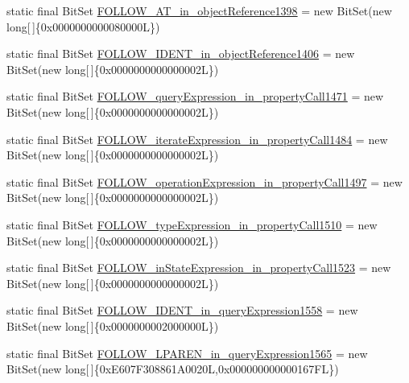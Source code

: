 \begin{DoxyCompactItemize}
static final Bit\-Set \hyperlink{classorg_1_1tzi_1_1use_1_1parser_1_1ocl_1_1_o_c_l_parser_aee007cd7fe0376940860c9b95a71a9f0}{F\-O\-L\-L\-O\-W\-\_\-\-A\-T\-\_\-in\-\_\-object\-Reference1398} = new Bit\-Set(new long\mbox{[}$\,$\mbox{]}\{0x0000000000080000\-L\})
\item 
static final Bit\-Set \hyperlink{classorg_1_1tzi_1_1use_1_1parser_1_1ocl_1_1_o_c_l_parser_ac5cac8876cc489e9118cdfc4c676e02a}{F\-O\-L\-L\-O\-W\-\_\-\-I\-D\-E\-N\-T\-\_\-in\-\_\-object\-Reference1406} = new Bit\-Set(new long\mbox{[}$\,$\mbox{]}\{0x0000000000000002\-L\})
\item 
static final Bit\-Set \hyperlink{classorg_1_1tzi_1_1use_1_1parser_1_1ocl_1_1_o_c_l_parser_ab70b57de14ff773a101dc37271d4071f}{F\-O\-L\-L\-O\-W\-\_\-query\-Expression\-\_\-in\-\_\-property\-Call1471} = new Bit\-Set(new long\mbox{[}$\,$\mbox{]}\{0x0000000000000002\-L\})
\item 
static final Bit\-Set \hyperlink{classorg_1_1tzi_1_1use_1_1parser_1_1ocl_1_1_o_c_l_parser_af5391c40accba0b4453f6aa9ad0dc9a6}{F\-O\-L\-L\-O\-W\-\_\-iterate\-Expression\-\_\-in\-\_\-property\-Call1484} = new Bit\-Set(new long\mbox{[}$\,$\mbox{]}\{0x0000000000000002\-L\})
\item 
static final Bit\-Set \hyperlink{classorg_1_1tzi_1_1use_1_1parser_1_1ocl_1_1_o_c_l_parser_aafda4243eb4565e6a54afe029381d5fb}{F\-O\-L\-L\-O\-W\-\_\-operation\-Expression\-\_\-in\-\_\-property\-Call1497} = new Bit\-Set(new long\mbox{[}$\,$\mbox{]}\{0x0000000000000002\-L\})
\item 
static final Bit\-Set \hyperlink{classorg_1_1tzi_1_1use_1_1parser_1_1ocl_1_1_o_c_l_parser_a7c905781f3d44ff44672f70030bad14d}{F\-O\-L\-L\-O\-W\-\_\-type\-Expression\-\_\-in\-\_\-property\-Call1510} = new Bit\-Set(new long\mbox{[}$\,$\mbox{]}\{0x0000000000000002\-L\})
\item 
static final Bit\-Set \hyperlink{classorg_1_1tzi_1_1use_1_1parser_1_1ocl_1_1_o_c_l_parser_a9ec0118a9d35dfc372c9823c29d1bf95}{F\-O\-L\-L\-O\-W\-\_\-in\-State\-Expression\-\_\-in\-\_\-property\-Call1523} = new Bit\-Set(new long\mbox{[}$\,$\mbox{]}\{0x0000000000000002\-L\})
\item 
static final Bit\-Set \hyperlink{classorg_1_1tzi_1_1use_1_1parser_1_1ocl_1_1_o_c_l_parser_ae8313106261001e2219b9b3674318fb2}{F\-O\-L\-L\-O\-W\-\_\-\-I\-D\-E\-N\-T\-\_\-in\-\_\-query\-Expression1558} = new Bit\-Set(new long\mbox{[}$\,$\mbox{]}\{0x0000000002000000\-L\})
\item 
static final Bit\-Set \hyperlink{classorg_1_1tzi_1_1use_1_1parser_1_1ocl_1_1_o_c_l_parser_a36df1203578139a5c16aa7408240f5d9}{F\-O\-L\-L\-O\-W\-\_\-\-L\-P\-A\-R\-E\-N\-\_\-in\-\_\-query\-Expression1565} = new Bit\-Set(new long\mbox{[}$\,$\mbox{]}\{0x\-E607\-F308861\-A0020\-L,0x000000000000167\-F\-L\})

\end{DoxyCompactItemize}
